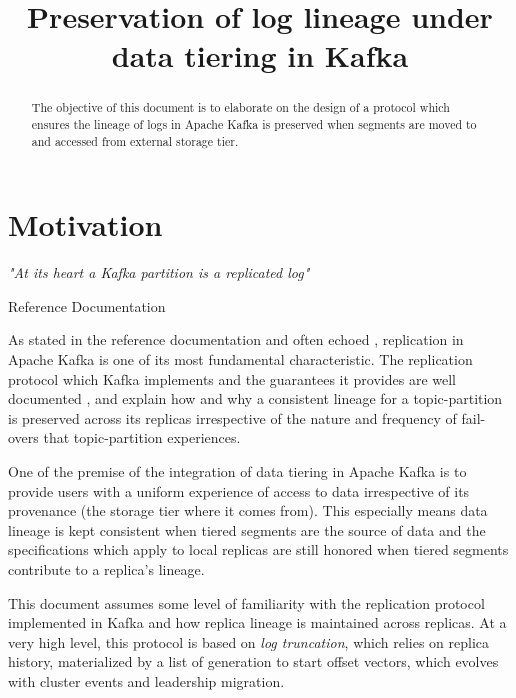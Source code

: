 \documentclass{article}
\title{Preservation of log lineage under data tiering in Kafka}
\begin{document}
\maketitle \thispagestyle{fancy2}
\begin{abstract}
	The objective of this document is to elaborate on the design of a protocol which ensures the lineage of logs in Apache Kafka is preserved  when segments are moved to and accessed from external storage tier.
\end{abstract}

\section{Motivation}
\epigraph{\textit{"At its heart a Kafka partition is a replicated log"}}{Reference Documentation \cite{RD1}}

As stated in the reference documentation and often echoed \cite{KDG}, replication in Apache Kafka is one of its most fundamental characteristic. The replication protocol which Kafka implements and the guarantees it provides are well documented \cite{KIP101} \cite{KIP279}, and explain how and why a consistent lineage for a topic-partition is preserved across its replicas irrespective of the nature and frequency of fail-overs that topic-partition experiences. 

One of the premise of the integration of data tiering in Apache Kafka is to provide users with a uniform experience of access to data irrespective of its provenance (the storage tier where it comes from). This especially means data lineage is kept consistent when tiered segments are the source of data and the specifications which apply to local replicas are still honored when tiered segments contribute to a replica's lineage.

This document assumes some level of familiarity with the replication protocol implemented in Kafka and how replica lineage is maintained across replicas. At a very high level, this protocol is based on \textit{log truncation}, which relies on replica history, materialized by a list of generation to start offset vectors, which evolves with cluster events and leadership migration.


{}
\end{document}
